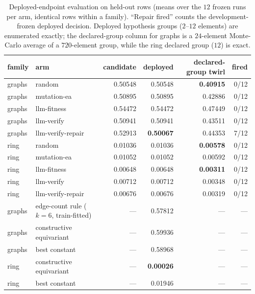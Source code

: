 \documentclass{neurips_2024}
\begin{document}
\begin{table}[t]
\centering
\caption{Deployed-endpoint evaluation on held-out rows (means over the $12$ frozen runs per
arm, identical rows within a family). ``Repair fired'' counts the development-frozen deployed
decision. Deployed hypothesis groups ($2$--$12$ elements) are enumerated exactly; the
declared-group column for graphs is a $24$-element Monte-Carlo average of a $720$-element
group, while the ring declared group ($12$) is exact.}
\label{tab:deployed}
\small
\begin{tabular}{@{}llrrrr@{}}
\toprule
family & arm & candidate & deployed & declared-group twirl & fired \\
\midrule
graphs & random            & 0.50548 & 0.50548 & \textbf{0.40915} & 0/12 \\
graphs & mutation-ea       & 0.50895 & 0.50895 & 0.42886 & 0/12 \\
graphs & llm-fitness       & 0.54472 & 0.54472 & 0.47449 & 0/12 \\
graphs & llm-verify        & 0.50941 & 0.50941 & 0.43511 & 0/12 \\
graphs & llm-verify-repair & 0.52913 & \textbf{0.50067} & 0.44353 & 7/12 \\
\midrule
ring & random            & 0.01036 & 0.01036 & \textbf{0.00578} & 0/12 \\
ring & mutation-ea       & 0.01052 & 0.01052 & 0.00592 & 0/12 \\
ring & llm-fitness       & 0.00648 & 0.00648 & \textbf{0.00311} & 0/12 \\
ring & llm-verify        & 0.00712 & 0.00712 & 0.00348 & 0/12 \\
ring & llm-verify-repair & 0.00676 & 0.00676 & 0.00319 & 0/12 \\
\midrule
graphs & edge-count rule ($k{=}6$, train-fitted) & --- & 0.57812 & --- & --- \\
graphs & constructive equivariant & --- & 0.59936 & --- & --- \\
graphs & best constant & --- & 0.58968 & --- & --- \\
ring & constructive equivariant & --- & \textbf{0.00026} & --- & --- \\
ring & best constant & --- & 0.01946 & --- & --- \\
\bottomrule
\end{tabular}
\end{table}
\end{document}
